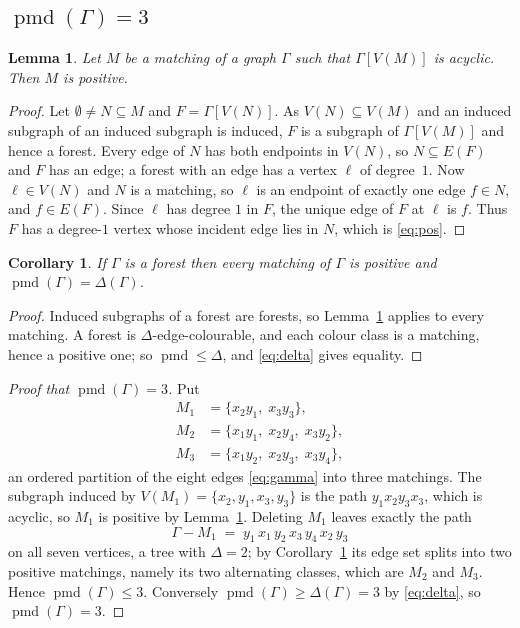 \documentclass[11pt]{amsart}
\newtheorem{lemma}[theorem]{Lemma}
\newtheorem{corollary}[theorem]{Corollary}
\theoremstyle{remark}
\newcommand{\pmd}{\operatorname{pmd}}
\newcommand{\Gam}{\Gamma}
\begin{document}
\subsection*{$\pmd(\Gam)=3$}

\begin{lemma}\label{lem:forest}
Let $M$ be a matching of a graph $\Gam$ such that $\Gam[V(M)]$ is acyclic.
Then $M$ is positive.
\end{lemma}

\begin{proof}
Let $\emptyset\neq N\subseteq M$ and $F=\Gam[V(N)]$. As $V(N)\subseteq V(M)$
and an induced subgraph of an induced subgraph is induced, $F$ is a subgraph of
$\Gam[V(M)]$ and hence a forest. Every edge of $N$ has both endpoints in
$V(N)$, so $N\subseteq E(F)$ and $F$ has an edge; a forest with an edge has a
vertex $\ell$ of degree~$1$. Now $\ell\in V(N)$ and $N$ is a matching, so
$\ell$ is an endpoint of exactly one edge $f\in N$, and $f\in E(F)$. Since
$\ell$ has degree $1$ in $F$, the unique edge of $F$ at $\ell$ is $f$. Thus
$F$ has a degree-$1$ vertex whose incident edge lies in $N$, which is
\eqref{eq:pos}.
\end{proof}

\begin{corollary}\label{cor:forest}
If $\Gam$ is a forest then every matching of $\Gam$ is positive and
$\pmd(\Gam)=\Delta(\Gam)$.
\end{corollary}

\begin{proof}
Induced subgraphs of a forest are forests, so Lemma~\ref{lem:forest} applies to
every matching. A forest is $\Delta$-edge-colourable, and each colour class is
a matching, hence a positive one; so $\pmd\le\Delta$, and \eqref{eq:delta}
gives equality.
\end{proof}

\begin{proof}[Proof that $\pmd(\Gam)=3$]
Put
\begin{align*}
  M_1&=\{x_2y_1,\;x_3y_3\},\\
  M_2&=\{x_1y_1,\;x_2y_4,\;x_3y_2\},\\
  M_3&=\{x_1y_2,\;x_2y_3,\;x_3y_4\},
\end{align*}
an ordered partition of the eight edges \eqref{eq:gamma} into three matchings.
The subgraph induced by $V(M_1)=\{x_2,y_1,x_3,y_3\}$ is the path
$y_1x_2y_3x_3$, which is acyclic, so $M_1$ is positive by
Lemma~\ref{lem:forest}. Deleting $M_1$ leaves exactly the path
\[
  \Gam-M_1 \;=\; y_1\,x_1\,y_2\,x_3\,y_4\,x_2\,y_3
\]
on all seven vertices, a tree with $\Delta=2$; by Corollary~\ref{cor:forest}
its edge set splits into two positive matchings, namely its two alternating
classes, which are $M_2$ and $M_3$. Hence $\pmd(\Gam)\le3$. Conversely
$\pmd(\Gam)\ge\Delta(\Gam)=3$ by \eqref{eq:delta}, so $\pmd(\Gam)=3$.
\end{proof}
\end{document}
